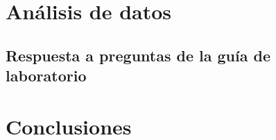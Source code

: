 \documentclass[letterpaper, 12pt]{report}
\begin{document}
\section{Análisis de datos}

\subsection{Respuesta a preguntas de la guía de laboratorio}

\section{Conclusiones}

\newpage

\end{document}
